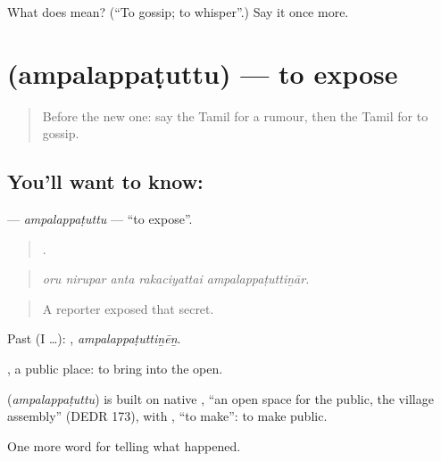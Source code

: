 \begin{tcolorbox}[breakable,colback=teal!4,colframe=teal!35!black,title={Before you move on}]
What does  mean? (\textquotedblleft{}To gossip; to whisper\textquotedblright{}.) Say it once more.
\end{tcolorbox}
\section[\texorpdfstring{\ta{அம்பலப்படுத்து} (ampalappaṭuttu)}{அம்பலப்படுத்து (ampalappaṭuttu)}]{ (ampalappaṭuttu) — to expose}

\label{lesson:TA-C308-ampalappatuttu}



\begin{quote}
Before the new one: say the Tamil for a rumour, then the Tamil for to gossip.
\end{quote}

\subsection*{You'll want to know: }
\textbf{} — \emph{ampalappaṭuttu} — \textquotedblleft{}to expose\textquotedblright{}.

\begin{quote}
    .
\end{quote}

\begin{quote}
\emph{oru nirupar anta rakaciyattai ampalappaṭuttiṉār.}
\end{quote}

\begin{quote}
A reporter exposed that secret.
\end{quote}

Past (I …): , \emph{ampalappaṭuttiṉēṉ}.

, a public place: to bring into the open.

\begin{cousinweb}
\textbf{} (\emph{ampalappaṭuttu}) is built on native , \textquotedblleft{}an open space for the public, the village assembly\textquotedblright{} (DEDR 173), with , \textquotedblleft{}to make\textquotedblright{}: to make public.
\end{cousinweb}

\begin{grammarlens}[title={What you've built}]
One more word for telling what happened.
\end{grammarlens}

